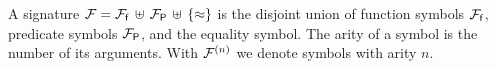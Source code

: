 
\begin{definition}\label{def:signature}
A 
{\myem signature} 
${\mathcal F} = {{\mathcal F}_{\mathsf f}}\,\uplus\,{{\mathcal F}_{\mathsf P}}\,\uplus\,\{\approx\}$ 
is the disjoint union of 
{\myem function symbols} ${{\mathcal F}_{\mathsf f}}$, 
{\myem predicate symbols} ${{\mathcal F}_{\mathsf P}}$,
and the equality symbol.
%
The {\myem arity} of a symbol is the number of its arguments.
With ${\mathcal F^{(n)}}$ we denote symbols with arity $n$.
\end{definition}
